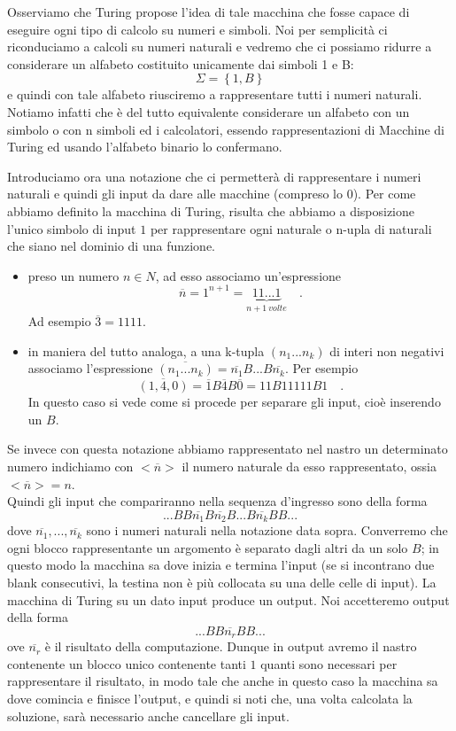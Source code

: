 Osserviamo che Turing propose l'idea di tale macchina che fosse capace
di eseguire ogni tipo di calcolo su numeri e simboli. Noi per
semplicit\`a ci riconduciamo a calcoli su numeri naturali e vedremo
che ci possiamo ridurre a considerare un alfabeto costituito
unicamente dai simboli 1 e B: $$\Sigma=\left\{1,B\right\}$$ e quindi
con tale alfabeto riusciremo a rappresentare tutti i numeri
naturali. Notiamo infatti che \`e del tutto equivalente considerare un
alfabeto con un simbolo o con n simboli ed i calcolatori, essendo
rappresentazioni di Macchine di Turing ed usando l'alfabeto binario lo
confermano.

Introduciamo ora una notazione che ci permetter\`a di rappresentare i
numeri naturali e quindi gli input da dare alle macchine (compreso lo
0). Per come abbiamo definito la macchina di Turing, risulta che
abbiamo a disposizione l'unico simbolo di input $1$ per rappresentare
ogni naturale o n-upla di naturali che siano nel dominio di una
funzione.

\begin{itemize}
\item preso un numero $n\in {N}$, ad esso associamo un'espressione
$$\overline{n}=1^{n+1}=\underbrace{11...1}_{n+1\ volte}\quad\mbox{.}$$
  Ad esempio $\overline{3}=1111$.
\item in maniera del tutto analoga, a una k-tupla $(n_{1}...n_{k})$ di
  interi non negativi associamo l'espressione
  $\overline{(n_{1}...n_{k})}=\overline{n_{1}}B...B\overline{n_{k}}$. Per
  esempio $$\overline{(1,4,0)}=\overline{1}B\overline{4}B\overline{0}=
  11B11111B1\quad\mbox {.}$$ In questo caso si vede come si procede
  per separare gli input, cio\`e inserendo un $B$.
\end{itemize}

Se invece con questa notazione abbiamo rappresentato nel nastro un
determinato numero indichiamo con $<\overline{n}>$ il numero naturale
da esso rappresentato, ossia $<\overline{n}>=n$.\\ Quindi gli input
che compariranno nella sequenza d'ingresso sono della forma
$$...BB\overline{n_{1}}B\overline{n_{2}}B...B\overline{n_{k}}BB...$$
dove $\overline{n_1},...,\overline{n_k}$ sono i numeri naturali nella
notazione data sopra. Converremo che ogni blocco rappresentante un
argomento \`e separato dagli altri da un solo $B$; in questo modo la
macchina sa dove inizia e termina l'input (se si incontrano due blank
consecutivi, la testina non \`e pi\`u collocata su una delle celle di
input).  La macchina di Turing su un dato input produce un output. Noi
accetteremo output della forma $$...BB\overline{n_r}BB...$$ ove
$\overline{n_r}$ \`e il risultato della computazione. Dunque in output
avremo il nastro contenente un blocco unico contenente tanti $1$
quanti sono necessari per rappresentare il risultato, in modo tale che
anche in questo caso la macchina sa dove comincia e finisce l'output,
e quindi si noti che, una volta calcolata la soluzione, sar\`a
necessario anche cancellare gli input.

